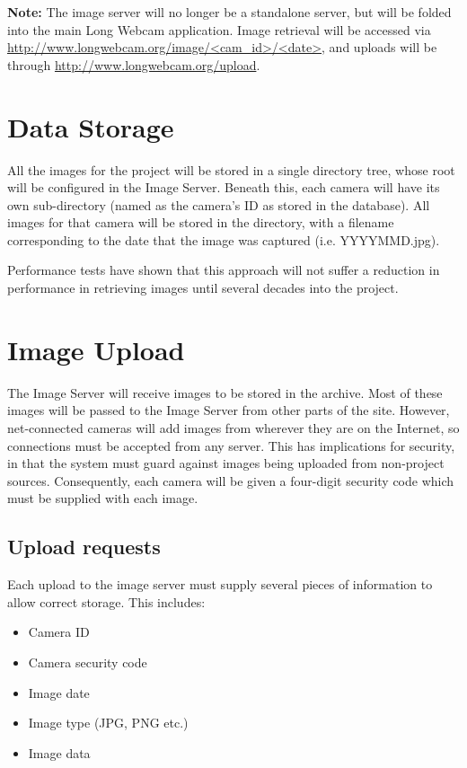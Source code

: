 \documentclass[11pt]{article}
\begin{document}
\textbf{Note:} The image server will no longer be a standalone server, but will be folded into the main Long Webcam application. Image retrieval will be accessed via \url{http://www.longwebcam.org/image/<cam_id>/<date>}, and uploads will be through \url{http://www.longwebcam.org/upload}.

\section{Data Storage}
All the images for the project will be stored in a single directory tree, whose root will be configured in the Image Server. Beneath this, each camera will have its own sub-directory (named as the camera's ID as stored in the database). All images for that camera will be stored in the directory, with a filename corresponding to the date that the image was captured (i.e. YYYYMMD.jpg). 

Performance tests have shown that this approach will not suffer a reduction in performance in retrieving images until several decades into the project.

\section{Image Upload}
The Image Server will receive images to be stored in the archive. Most of these images will be passed to the Image Server from other parts of the site. However, net-connected cameras will add images from wherever they are on the Internet, so connections must be accepted from any server. This has implications for security, in that the system must guard against images being uploaded from non-project sources. Consequently, each camera will be given a four-digit security code which must be supplied with each image.

\subsection{Upload requests}
Each upload to the image server must supply several pieces of information to allow correct storage. This includes:

\begin{itemize}
\item Camera ID
\item Camera security code
\item Image date
\item Image type (JPG, PNG etc.)
\item Image data
\end{itemize}
\end{document}
